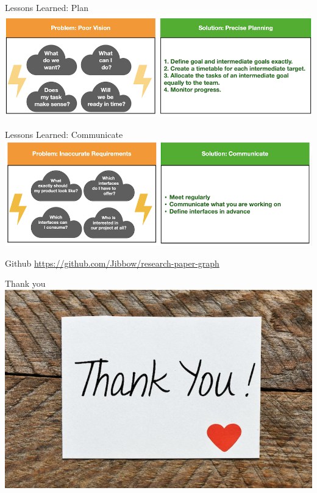 \documentclass{beamer}
\begin{document}
\begin{frame}{Lessons Learned: Plan}
    \includegraphics{img_11.png}
\end{frame}

\begin{frame}{Lessons Learned: Communicate}
    \includegraphics{img_12.png}
\end{frame}

\begin{frame}{Github}
    \url{https://github.com/Jibbow/research-paper-graph}
\end{frame}

\begin{frame}{Thank you}
    \includegraphics{img_05.png}
\end{frame}
\end{document}
